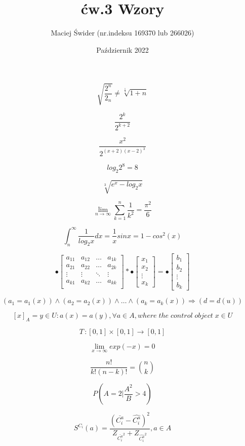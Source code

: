 \documentclass[12pt, letterpaper, titlepage]{article}
\title{ćw.3 Wzory}
\author{Maciej Świder (nr.indeksu 169370 lub 266026)}
\date{Październik 2022}
\begin{document}
$$ \sqrt { \frac{2^{n}}{2_n}} \neq \sqrt[ \frac{1}{3}]{1+n} $$

$$ \frac{2^k}{2^{k+2}} $$

$$ \frac{x^2}{2^{(x+2)(x-2)^3}} $$

$$ log_{2}{2^8} = 8 $$

$$ \sqrt[3]{{e^x}-log_{2}x} $$

$$ \lim_{n\to\infty} \sum_{k=1}^{n} \frac{1}{k^2} = \frac{\pi^2}{6} $$

$$ \int_n ^{\infty} \frac{1}{log_2 x} dx = \frac{1}{x}sin x=1 - cos^2 (x )$$

$$ \mathbf{•}
\left[\begin{array}{cccc}
a_{11} & a_{12} & \ldots  & a_{1k} \\
a_{21} & a_{22} & \ldots  & a_{2k} \\
\vdots & \vdots & \ddots & \vdots \\
a_{k1} & a_{k2} & \ldots  & a_{kk} \\

\end{array} \right] * 
\mathbf{•}
\left[\begin{array}{c}x_{1}\\x_{2}\\ \vdots\\ x_{k} \end{array}\right] = \mathbf{•}
\left[\begin{array}{c}b_{1}\\b_{2}\\ \vdots\\ b_{k} \end{array}\right]$$ 

$$ (a_1 = a_1(x)) \wedge (a_2 = a_2(x)) \wedge \ldots \wedge (a_k = a_k(x)) \Rightarrow (d= d(u)) $$

$$ [x]_A = {y \in U : a(x)= a(y), \forall a \in A}, where \; the \; control \; object \; x \in U $$

$$ T \, : [0,1] \times [0,1] \rightarrow [0,1 ]$$

$$ \lim_{x\to\infty} exp (-x) =0 $$

$$ \frac{n!}{k!{(n-k)!}} = {n\choose k} $$

$$ P \left(A=2 \Big| \frac{A^2}{B} >4 \right) $$

$$ S^{C_i}(a) = \frac{(\bar{C^a_i}-\hat{C^a_i})^2}{Z_{\bar{C^a_i}^2}+Z_{\hat{C^a_i}^2}}, a \in A $$
\end{document}

